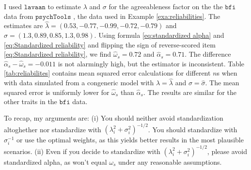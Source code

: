 \documentclass[twoside]{article}
\begin{document}
\begin{example}

I used $\mathtt{lavaan}$ to estimate $\lambda$ and $\sigma$ for the agreeableness factor on the the $\texttt{bfi}$ data from $\texttt{psychTools}$ \citep{Revelle2019-te}, the data used in Example \ref{exa:reliabilities}. The estimates are $\hat{\lambda} = (0.53, -0.77, -0.99, -0.72, -0.79)$ and $\hat{\sigma} = (1.3, 0.89, 0.85, 1.3, 0.98)$. Using formula \eqref{eq:standardized alpha} and \eqref{eq:Standardized reliability} and flipping the sign of reverse-scored item \eqref{eq:Standardized reliability}, we find $\hat{\omega}_s = 0.72$ and $\hat{\alpha}_s = 0.71$. The difference $\hat{\alpha}_s - \hat{\omega}_s = -0.011$ is not alarmingly high, but the estimator is inconsistent. Table \ref{tab:reliabilites} contains mean squared error calculations for different $n$s when with data simulated from a congeneric model with $\lambda=\hat{\lambda}$ and $\sigma = \hat{\sigma}$. The mean squared error is uniformly lower for $\hat{\omega}_s$ than $\hat{\alpha}_s$. The results are similar for the other traits in the $\texttt{bfi}$ data.
\end{example}

To recap, my arguments are: (i) You should neither avoid standardization altoghether nor standardize with $(\lambda_{i}^{2}+\sigma_{i}^{2})^{-1/2}$. You should standardize with $\sigma_i^{-1}$ or use the optimal weights, as this yields better results in the most plausible scenarios. (ii) Even if you decide to standardize with $(\lambda_{i}^{2}+\sigma_{i}^{2})^{-1/2}$, please avoid standardized alpha, as won't equal $\omega_s$ under any reasonable assumptions.


\end{document}
